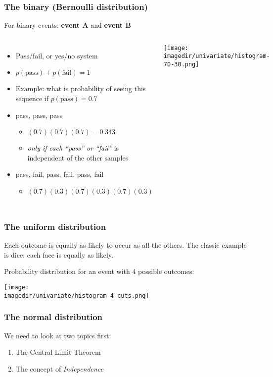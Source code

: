 \begin{frame}\frametitle{The \textbf{binary} (Bernoulli distribution)}
	For binary events: \textbf{event A} and \textbf{event B}
	\begin{columns}
		\column{6cm}
		\begin{itemize}
			\item	Pass/fail, or yes/no system
			\item	$p(\text{pass}) + p(\text{fail}) = 1$
			\item	Example: what is probability of seeing this sequence if $p(\text{pass}) = 0.7$
			\item	pass, pass, pass
			\begin{itemize}
				\item	$(0.7)(0.7)(0.7) = 0.343$
				\item	\emph{only if each ``pass'' or ``fail''} is independent of the other samples
			\end{itemize}
			\item	pass, fail, pass, fail, pass, fail
			\begin{itemize}
				\item	$(0.7)(0.3)(0.7)(0.3)(0.7)(0.3)$
			\end{itemize}
		\end{itemize}
		\column{5cm}
		\texttt{[image: \\imagedir/univariate/histogram-70-30.png]}
	\end{columns}
\end{frame}

\begin{frame}\frametitle{The \textbf{uniform} distribution}
	Each outcome is equally as likely to occur as all the others. The classic example is dice: each face is equally as likely.

	Probability distribution for an event with 4 possible outcomes:
	\begin{center}
		\texttt{[image: \\imagedir/univariate/histogram-4-cuts.png]}
	\end{center}
\end{frame}

\begin{frame}\frametitle{The \textbf{normal} distribution}

	We need to look at two topics first:
	\begin{enumerate}
		\item	The Central Limit Theorem
		\item	The concept of \emph{Independence}
	\end{enumerate}
\end{frame}

